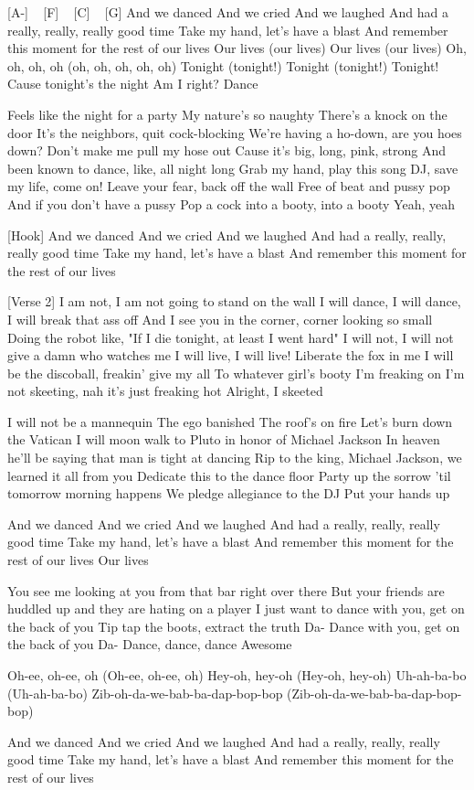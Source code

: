 
[A-] ~ [F] ~ [C] ~ [G]
And we danced
And we cried
And we laughed
And had a really, really, really good time
Take my hand, let's have a blast
And remember this moment for the rest of our lives
Our lives (our lives)
Our lives (our lives)
Oh, oh, oh, oh (oh, oh, oh, oh, oh)
Tonight (tonight!)
Tonight (tonight!)
Tonight!
Cause tonight's the night
Am I right?
Dance

Feels like the night for a party
My nature's so naughty
There's a knock on the door
It's the neighbors, quit cock-blocking
We're having a ho-down, are you hoes down?
Don't make me pull my hose out
Cause it's big, long, pink, strong
And been known to dance, like, all night long
Grab my hand, play this song
DJ, save my life, come on!
Leave your fear, back off the wall
Free of beat and pussy pop
And if you don't have a pussy
Pop a cock into a booty, into a booty
Yeah, yeah

[Hook]
And we danced
And we cried
And we laughed
And had a really, really, really good time
Take my hand, let's have a blast
And remember this moment for the rest of our lives

[Verse 2]
I am not, I am not going to stand on the wall
I will dance, I will dance, I will break that ass off
And I see you in the corner, corner looking so small
Doing the robot like, "If I die tonight, at least I went hard"
I will not, I will not give a damn who watches me
I will live, I will live! Liberate the fox in me
I will be the discoball, freakin' give my all
To whatever girl's booty I'm freaking on
I'm not skeeting, nah it's just freaking hot
Alright, I skeeted

I will not be a mannequin
The ego banished
The roof's on fire
Let's burn down the Vatican
I will moon walk to Pluto in honor of Michael Jackson
In heaven he'll be saying that man is tight at dancing
Rip to the king, Michael Jackson, we learned it all from you
Dedicate this to the dance floor
Party up the sorrow 'til tomorrow morning happens
We pledge allegiance to the DJ
Put your hands up

And we danced
And we cried
And we laughed
And had a really, really, really good time
Take my hand, let's have a blast
And remember this moment for the rest of our lives
Our lives

You see me looking at you from that bar right over there
But your friends are huddled up and they are hating on a player
I just want to dance with you, get on the back of you
Tip tap the boots, extract the truth
Da- Dance with you, get on the back of you
Da- Dance, dance, dance
Awesome

Oh-ee, oh-ee, oh
(Oh-ee, oh-ee, oh)
Hey-oh, hey-oh
(Hey-oh, hey-oh)
Uh-ah-ba-bo
(Uh-ah-ba-bo)
Zib-oh-da-we-bab-ba-dap-bop-bop
(Zib-oh-da-we-bab-ba-dap-bop-bop)

And we danced
And we cried
And we laughed
And had a really, really, really good time
Take my hand, let's have a blast
And remember this moment for the rest of our lives